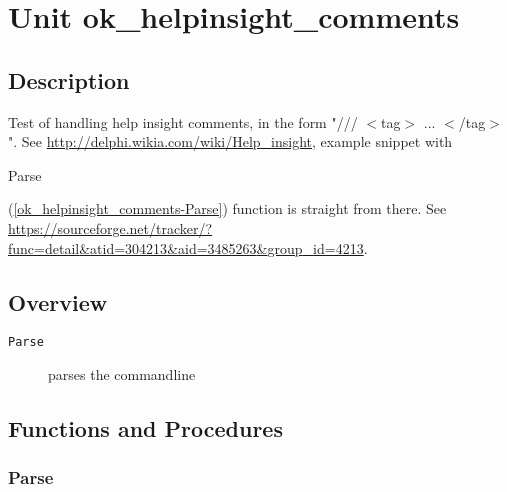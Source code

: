 \documentclass{report}
\newif\ifpdf
\begin{document}
\label{toc}\tableofcontents
\newpage
\newlength{\tmplength}
\chapter{Unit ok{\_}helpinsight{\_}comments}
\label{ok_helpinsight_comments}
\section{Description}
Test of handling help insight comments, in the form "/// {$<$}tag{$>$} ... {$<$}/tag{$>$}". See \href{http://delphi.wikia.com/wiki/Help_insight}{http://delphi.wikia.com/wiki/Help{\_}insight}, example snippet with \begin{ttfamily}Parse\end{ttfamily}(\ref{ok_helpinsight_comments-Parse}) function is straight from there. See \href{https://sourceforge.net/tracker/?func=detail&atid=304213&aid=3485263&group_id=4213}{https://sourceforge.net/tracker/?func=detail{\&}atid=304213{\&}aid=3485263{\&}group{\_}id=4213}.
\section{Overview}
\begin{description}
\item[\texttt{Parse}]parses the commandline
\end{description}
\section{Functions and Procedures}
\ifpdf
\subsection*{\large{\textbf{Parse}}\normalsize\hspace{1ex}\hrulefill}
\else
\end{document}
